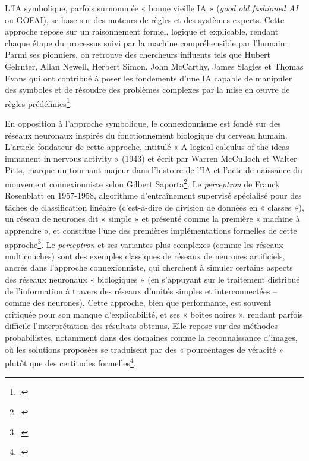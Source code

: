 \newline

L'IA symbolique, parfois surnommée « bonne vieille IA » (\textit{good old fashioned AI} ou GOFAI), se base sur des moteurs de règles et des systèmes experts. Cette approche repose sur un raisonnement formel, logique et explicable, rendant chaque étape du processus suivi par la machine compréhensible par l’humain. Parmi ses pionniers, on retrouve des chercheurs influents tels que Hubert Gelrnter, Allan Newell, Herbert Simon, John McCarthy, James Slagles et Thomas Evans qui ont contribué à poser les fondements d'une IA capable de manipuler des symboles et de résoudre des problèmes complexes par la mise en œuvre de règles prédéfinies\footcite{ezratty_que_nodate}.

\newline

En opposition à l'approche symbolique, le connexionnisme est fondé sur des réseaux neuronaux inspirés du fonctionnement biologique du cerveau humain. L'article fondateur de cette approche, intitulé « A logical calculus of the ideas immanent in nervous activity » (1943) et écrit par Warren McCulloch et Walter Pitts, marque un tournant majeur dans l'histoire de l'IA et l’acte de naissance du mouvement connexionniste selon Gilbert Saporta\footcite[p.3]{saporta_breve_2018}. Le \textit{perceptron} de Franck Rosenblatt en 1957-1958, algorithme d’entraînement supervisé spécialisé pour des tâches de classification linéaire (c’est-à-dire de division de données en « classes »), un réseau de neurones dit « simple » et présenté comme la première « machine à apprendre », et constitue l'une des premières implémentations formelles de cette approche\footcite[p.3]{saporta_breve_2018}. Le \textit{perceptron} et ses variantes plus complexes (comme les réseaux multicouches) sont des exemples classiques de réseaux de neurones artificiels, ancrés dans l’approche connexionniste, qui cherchent à simuler certains aspects des réseaux neuronaux « biologiques » (en s’appuyant sur le traitement distribué de l'information à travers des réseaux d'unités simples et interconnectées – comme des neurones).
Cette approche, bien que performante, est souvent critiquée pour son manque d'explicabilité, et ses « boîtes noires », rendant parfois difficile l'interprétation des résultats obtenus. Elle repose sur des méthodes probabilistes, notamment dans des domaines comme la reconnaissance d'images, où les solutions proposées se traduisent par des « pourcentages de véracité » plutôt que des certitudes formelles\footcite{ezratty_que_nodate}.

